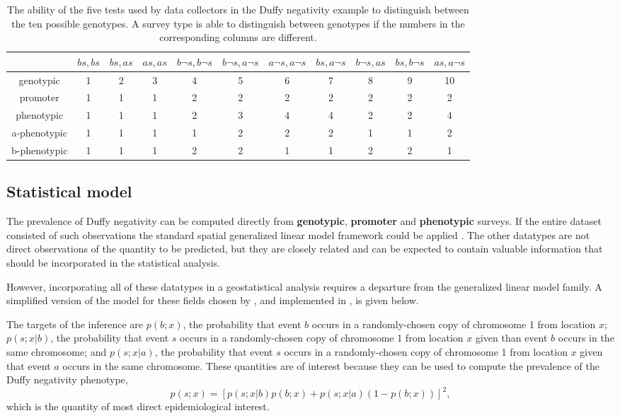 \documentclass[article]{jss}
\begin{document}
\begin{table}
    \centering
    \begin{small}
        \begin{tabular}{ccccccccccc}
            &$bs,bs$&$bs,as$&$as,as$&$b\neg s,b\neg s$&$b\neg s,a\neg s$&$a\neg s,a\neg s$&$bs,a\neg s$&$b\neg s,as$&$bs,b\neg s$&$as,a\neg s$\\
            \hline\hline
            genotypic&1&2&3&4&5&6&7&8&9&10\\
            promoter&1&1&1&2&2&2&2&2&2&2\\
            phenotypic&1&1&1&2&3&4&4&2&2&4\\
            a-phenotypic&1&1&1&1&2&2&2&1&1&2\\
            b-phenotypic&1&1&1&2&2&1&1&2&2&1
            \label{tab:equiv-class}
        \end{tabular}            
    \end{small}
    \caption{The ability of the five tests used by data collectors in the Duffy negativity example to distinguish between the ten possible genotypes. A survey type is able to distinguish between genotypes if the numbers in the corresponding columns are different.}
    \label{tab:surveys}  
\end{table}

\subsection{Statistical model}
The prevalence of Duffy negativity can be computed directly from \textbf{genotypic}, \textbf{promoter} and \textbf{phenotypic} surveys. If the entire dataset consisted of such observations the standard spatial generalized linear model framework could be applied \citep{diggle}. The other datatypes are not direct observations of the quantity to be predicted, but they are closely related and can be expected to contain valuable information that should be incorporated in the statistical analysis.

However, incorporating all of these datatypes in a geostatistical analysis requires a departure from the generalized linear model family. A simplified version of the model for these fields chosen by \cite{Howes}, and implemented in , is given below. 

The targets of the inference are $p(b;x)$, the probability that event $b$ occurs in a randomly-chosen copy of chromosome 1 from location $x$; $p(s;x|b)$, the probability that event $s$ occurs in a randomly-chosen copy of chromosome 1 from location $x$ given than event $b$ occurs in the same chromosome; and $p(s;x|a)$, the probability that event $s$ occurs in a randomly-chosen copy of chromosome 1 from location $x$ given that event $a$ occurs in the same chromosome. These quantities are of interest because they can be used to compute the prevalence of the Duffy negativity phenotype,
\begin{equation}
    \label{eq:duffy-formula} 
    p(s;x)=\left[p(s;x|b)p(b;x)+p(s;x|a)(1-p(b;x))\right]^2,
\end{equation}
which is the quantity of most direct epidemiological interest.
\end{document}
